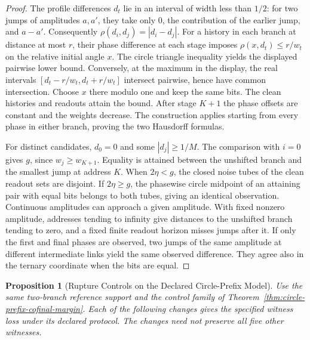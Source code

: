 \documentclass[11pt,a4paper]{article}
\newtheorem{proposition}[theorem]{Proposition}
\theoremstyle{definition}
\begin{document}
\begin{proof}
The profile differences $d_t$ lie in an interval of width less than $1/2$: for two jumps of amplitudes $a,a'$, they take only $0$, the contribution of the earlier jump, and $a-a'$. Consequently $\rho(d_i,d_j)=|d_i-d_j|$. For a history in each branch at distance at most $r$, their phase difference at each stage imposes $\rho(x,d_t)\le r/w_t$ on the relative initial angle $x$. The circle triangle inequality yields the displayed pairwise lower bound. Conversely, at the maximum in the display, the real intervals $[d_t-r/w_t,d_t+r/w_t]$ intersect pairwise, hence have common intersection. Choose $x$ there modulo one and keep the same bits. The clean histories and readouts attain the bound. After stage $K+1$ the phase offsets are constant and the weights decrease. The construction applies starting from every phase in either branch, proving the two Hausdorff formulas.

For distinct candidates, $d_0=0$ and some $|d_j|\ge1/M$. The comparison with $i=0$ gives $g$, since $w_j\ge w_{K+1}$. Equality is attained between the unshifted branch and the smallest jump at address $K$. When $2\eta<g$, the closed noise tubes of the clean readout sets are disjoint. If $2\eta\ge g$, the phasewise circle midpoint of an attaining pair with equal bits belongs to both tubes, giving an identical observation. Continuous amplitudes can approach a given amplitude. With fixed nonzero amplitude, addresses tending to infinity give distances to the unshifted branch tending to zero, and a fixed finite readout horizon misses jumps after it. If only the first and final phases are observed, two jumps of the same amplitude at different intermediate links yield the same observed difference. They agree also in the ternary coordinate when the bits are equal.
\end{proof}

\begin{proposition}[Rupture Controls on the Declared Circle-Prefix Model]\label{prop:circle-prefix-rupture-controls}
Use the same two-branch reference support and the control family of Theorem~\ref{thm:circle-prefix-cofinal-margin}. Each of the following changes gives the specified witness loss under its declared protocol. The changes need not preserve all five other witnesses.
\end{proposition}
\end{document}
